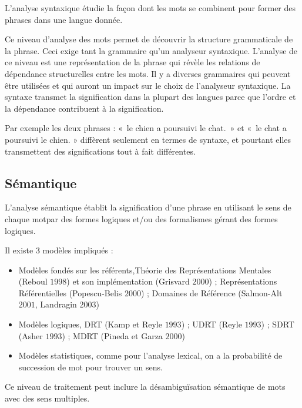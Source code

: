 	L’analyse syntaxique étudie la façon dont les mots se combinent pour former des phrases dans une langue donnée.
	\vspace{1em}
	
	Ce niveau d'analyse des mots permet de découvrir la structure grammaticale de la phrase. Ceci exige tant la grammaire qu'un analyseur syntaxique. L’analyse de ce niveau est une représentation de la phrase qui révèle les relations de dépendance structurelles entre les mots. Il y a diverses grammaires qui peuvent être utilisées et qui auront un impact sur le choix de l’analyseur syntaxique. La syntaxe transmet la signification dans la plupart des langues parce que l'ordre et la dépendance contribuent à la signification. 
	\vspace{1em}
	
Par exemple les deux phrases : « le chien a poursuivi le chat. » et « le chat a poursuivi le chien. » diffèrent seulement en termes de syntaxe, et pourtant elles transmettent des significations tout à fait différentes.


\subsection{Sémantique}

L’analyse sémantique établit la signification d’une phrase en utilisant le sens de chaque motpar des formes logiques et/ou des formalismes gérant des formes logiques.
\vspace{1em}

Il existe 3 modèles impliqués : 
\vspace{1em}

\begin{itemize}
	\item Modèles fondés sur les référents,Théorie des Représentations Mentales (Reboul $1998$) et son implémentation (Grisvard $2000$) ; Représentations Référentielles (Popescu-Belis $2000$) ; Domaines de Référence (Salmon-Alt $2001$, Landragin $2003$)
	\item Modèles logiques, DRT (Kamp et Reyle $1993$) ; UDRT (Reyle $1993$) ; SDRT (Asher $1993$) ; MDRT (Pineda et Garza $2000$)
	\item Modèles statistiques, comme pour l’analyse lexical, on a la probabilité de succession de mot pour trouver un sens.
\end{itemize}
\vspace{1em}


Ce niveau de traitement peut inclure la désambiguïsation sémantique de mots avec des sens multiples.
\vspace{1em}

